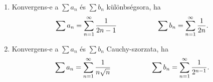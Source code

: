 \documentclass[a4paper, 12pt]{scrartcl}
\begin{document}
\begin{enumerate}
  \item Konvergens-e a $\sum a_n$ és $\sum b_n$ különbségsora, ha
        \[
          \sum a_n = \sum_{n = 1}^\infty \frac{1}{2n - 1}
          \hspace{2cm}
          \sum b_n = \sum_{n = 1}^\infty \frac{1}{2n}
          \text.
        \]

  \item Konvergens-e a $\sum a_n$ és $\sum b_n$ Cauchy-szorzata, ha
        \[
          \sum a_n = \sum_{n = 1}^\infty \frac{1}{n\sqrt{n}}
          \hspace{2cm}
          \sum b_n = \sum_{n = 1}^\infty \frac{1}{2^{n - 1}}
          \text.
        \]

\end{enumerate}

\end{document}
